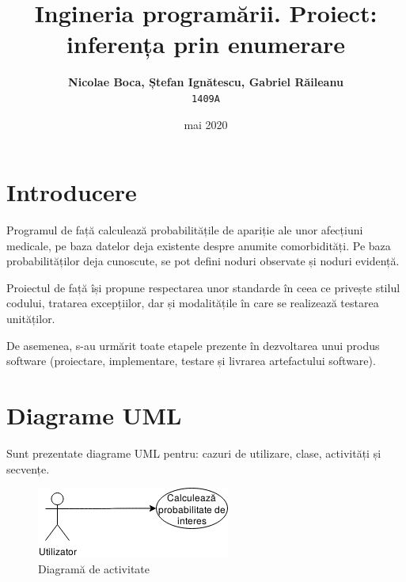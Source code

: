 \documentclass[12pt]{article}
\title{Ingineria programării. Proiect: inferența prin enumerare} %
\author{\textbf{Nicolae Boca, Ștefan Ignătescu, Gabriel Răileanu}\\ \texttt{1409A}}
\date{mai 2020}
\begin{document}
\maketitle

\section{Introducere}
Programul de față calculează probabilitățile de apariție ale unor afecțiuni medicale, pe baza datelor deja existente despre anumite comorbidități. Pe baza probabilităților deja cunoscute, se pot defini noduri observate și noduri evidență.
\par
Proiectul de față își propune respectarea unor standarde în ceea ce privește stilul codului, tratarea excepțiilor, dar și modalitățile în care se realizează testarea unităților.
\par
De asemenea, s-au urmărit toate etapele prezente în dezvoltarea unui produs software (proiectare, implementare, testare și livrarea artefactului software).
\section{Diagrame UML}
Sunt prezentate diagrame UML pentru: cazuri de utilizare, clase, activități și secvențe.
\begin{figure}[H]
	\centering
	\includegraphics{img/useCaseDiagram.png}
	\caption{Diagramă de activitate}
\end{figure}
\end{document}
